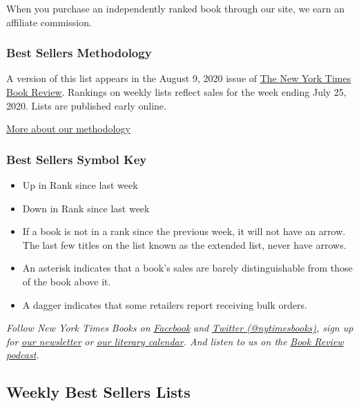 When you purchase an independently ranked book through our site, we earn
an affiliate commission.

\hypertarget{best-sellers-methodology}{%
\subsubsection{Best Sellers
Methodology}\label{best-sellers-methodology}}

A version of this list appears in the August 9, 2020 issue of
\href{http://www.nytimes3xbfgragh.onion/section/books/review}{The New
York Times Book Review}. Rankings on weekly lists reflect sales for the
week ending July 25, 2020. Lists are published early online.

\href{/books/best-sellers/methodology/}{More about our methodology}

\hypertarget{best-sellers-symbol-key}{%
\subsubsection{Best Sellers Symbol Key}\label{best-sellers-symbol-key}}

\begin{itemize}
\item
  Up in Rank since last week
\item
  Down in Rank since last week
\item
  If a book is not in a rank since the previous week, it will not have
  an arrow. The last few titles on the list known as the extended list,
  never have arrows.
\item
  An asterisk indicates that a book's sales are barely distinguishable
  from those of the book above it.
\item
  A dagger indicates that some retailers report receiving bulk orders.
\end{itemize}

\emph{Follow New York Times Books on}
\href{https://www.facebookcorewwwi.onion/nytbooks/}{\emph{Facebook}}
\emph{and} \href{https://twitter.com/nytimesbooks}{\emph{Twitter
(@nytimesbooks)}}\emph{, sign up for}
\href{https://www.nytimes3xbfgragh.onion/newsletters/books-review}{\emph{our
newsletter}} \emph{or}
\href{https://www.nytimes3xbfgragh.onion/interactive/2017/books/books-calendar.html}{\emph{our
literary calendar}}\emph{. And listen to us on the}
\href{https://www.nytimes3xbfgragh.onion/column/book-review-podcast}{\emph{Book
Review podcast}}\emph{.}

\hypertarget{weekly-best-sellers-lists}{%
\subsection{Weekly Best Sellers Lists}\label{weekly-best-sellers-lists}}

